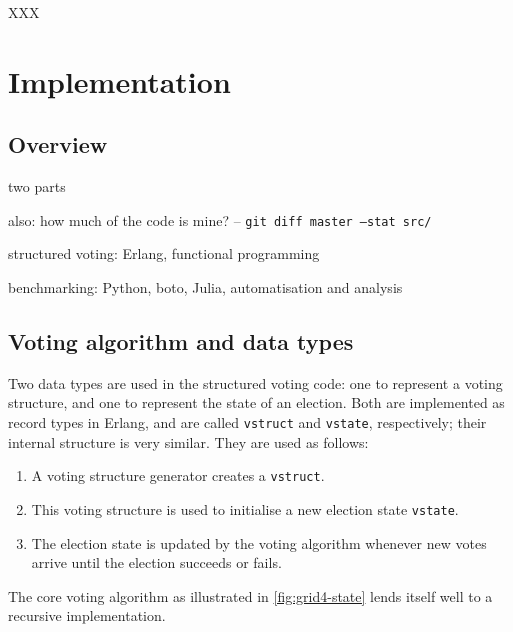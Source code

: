 \documentclass[draft,11pt,chapterprefix=true,toc=bibliography,numbers=noendperiod,
               footnotes=multiple,twoside]{scrreprt}
\begin{document}
XXX

\chapter{Implementation\label{ch:implementation}}


\section{Overview}

two parts

also: how much of the code is mine? -- \texttt{git diff master --stat src/}

structured voting: Erlang, functional programming

benchmarking: Python, boto, Julia, automatisation and analysis

\section{Voting algorithm and data types}

Two data types are used in the structured voting code: one to represent a voting structure, and one to represent the state of an election. Both are implemented as record types in Erlang, and are called \texttt{vstruct} and \texttt{vstate}, respectively; their internal structure is very similar. They are used as follows:

\begin{enumerate}
    \item A voting structure generator creates a \texttt{vstruct}.
    \item This voting structure is used to initialise a new election state \texttt{vstate}.
    \item The election state is updated by the voting algorithm whenever new votes arrive until the election succeeds or fails.
\end{enumerate}

The core voting algorithm as illustrated in \autoref{fig:grid4-state} lends itself well to a recursive implementation.
\end{document}
